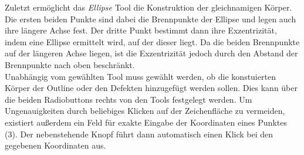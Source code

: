 \documentclass[reducespace,stylepage,semiarbeit]{spezidoc}
\begin{document}
Zuletzt ermöglicht das \textit{Ellipse} Tool die Konstruktion der gleichnamigen Körper.
Die ersten beiden Punkte sind dabei die Brennpunkte der Ellipse und legen auch ihre längere Achse fest.
Der dritte Punkt bestimmt dann ihre Exzentrizität, indem eine Ellipse ermittelt wird, auf der dieser liegt.
Da die beiden Brennpunkte auf der längeren Achse liegen, ist die Exzentrizität jedoch durch den Abstand der Brennpunkte nach oben beschränkt.\\
Unabhängig vom gewählten Tool muss gewählt werden, ob die konstuierten Körper der Outline oder den Defekten hinzugefügt werden sollen. 
Dies kann über die beiden Radiobuttons rechts von den Tools festgelegt werden.
Um Ungenauigkeiten durch beliebiges Klicken auf der Zeichenfläche zu vermeiden, existiert außerdem ein Feld für exakte Eingabe der Koordinaten eines Punktes (3). Der nebenstehende Knopf führt dann automatisch einen Klick bei den gegebenen Koordinaten aus.

\newpage
\end{document}
